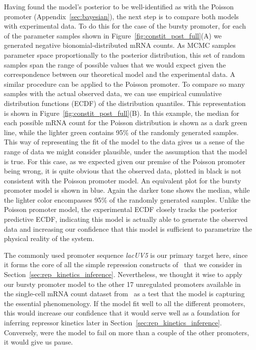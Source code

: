 Having found the model's posterior to be well-identified as with the Poisson
promoter (Appendix~\ref{sec:bayesian}), the next step is to compare both models
with experimental data. To do this for the case of the bursty promoter, for each
of the parameter samples shown in Figure~\ref{fig:constit_post_full}(A) we
generated negative bionomial-distributed mRNA counts. As MCMC samples parameter
space proportionally to the posterior distribution, this set of random samples
span the range of possible values that we would expect given the correspondence
between our theoretical model and the experimental data. A similar procedure can
be applied to the Poisson promoter. To compare so many samples with the actual
observed data, we can use empirical cumulative distribution functions (ECDF) of
the distribution quantiles. This representation is shown in
Figure~\ref{fig:constit_post_full}(B). In this example, the median for each
possible mRNA count for the Poisson distribution is shown as a dark green line,
while the lighter green contains 95\% of the randomly generated samples. This
way of representing the fit of the model to the data gives us a sense of the
range of data we might consider plausible, under the assumption that the model
is true. For this case, as we expected given our premise of the Poisson promoter
being wrong, it is quite obvious that the observed data, plotted in black is not
consistent with the Poisson promoter model. An equivalent plot for the bursty
promoter model is shown in blue. Again the darker tone shows the median, while
the lighter color encompasses 95\% of the randomly generated samples. Unlike the
Poisson promoter model, the experimental ECDF closely tracks the posterior
predictive ECDF, indicating this model is actually able to generate the observed
data and increasing our confidence that this model is sufficient to parametrize
the physical reality of the system.

The commonly used promoter sequence \textit{lacUV5} is our primary
target here, since it forms the core of all the
simple repression constructs of~\cite{Jones2014} that we consider in
Section~\ref{sec:rep_kinetics_inference}. Nevertheless, we thought it wise to
apply our bursty promoter model to the other 17 unregulated promoters available
in the single-cell mRNA count dataset from~\cite{Jones2014} as a test that the
model is capturing the essential phenomenology. If the model fit well to all the
different promoters, this would increase our confidence that it would serve well
as a foundation for inferring repressor kinetics later in
Section~\ref{sec:rep_kinetics_inference}. Conversely, were the model to fail on
more than a couple of the other promoters, it would give us pause.

